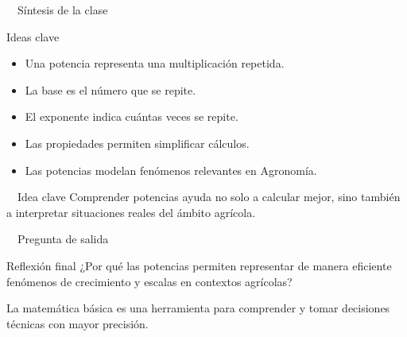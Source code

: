 \documentclass[aspectratio=169,10pt,handout]{beamer}
\newcommand{\iconoCierre}{\faCheckCircle}
\newcommand{\iconoIdea}{\faLightbulb}
\newenvironment{ideaBox}
{\begin{exampleblock}{\iconoIdea\ \ Idea clave}}
	{\end{exampleblock}}
\begin{document}
	\begin{frame}{\iconoCierre\ \ Síntesis de la clase}
		\begin{block}{Ideas clave}
			\begin{itemize}
				\item Una potencia representa una multiplicación repetida.
				\item La base es el número que se repite.
				\item El exponente indica cuántas veces se repite.
				\item Las propiedades permiten simplificar cálculos.
				\item Las potencias modelan fenómenos relevantes en Agronomía.
			\end{itemize}
		\end{block}
		
		\begin{ideaBox}
			Comprender potencias ayuda no solo a calcular mejor, sino también a interpretar situaciones reales del ámbito agrícola.
		\end{ideaBox}
	\end{frame}
	
	\begin{frame}{\iconoCierre\ \ Pregunta de salida}
		\begin{exampleblock}{Reflexión final}
			¿Por qué las potencias permiten representar de manera eficiente fenómenos de crecimiento y escalas en contextos agrícolas?
		\end{exampleblock}
		
		\vspace{0.4cm}
		
		\begin{center}
			{\Large\color{USTTeal}\faSeedling}
			
			\vspace{0.25cm}
			
			{\normalsize\textcolor{USTGray}{La matemática básica es una herramienta para comprender y tomar decisiones técnicas con mayor precisión.}}
		\end{center}
	\end{frame}
	
\end{document}
